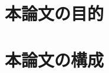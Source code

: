 \clearpage
\newpage
\section{本論文の目的}
\label{chap1_purpose}


\clearpage
\newpage

\section{本論文の構成}
\label{chap1_outline_of_paper}


